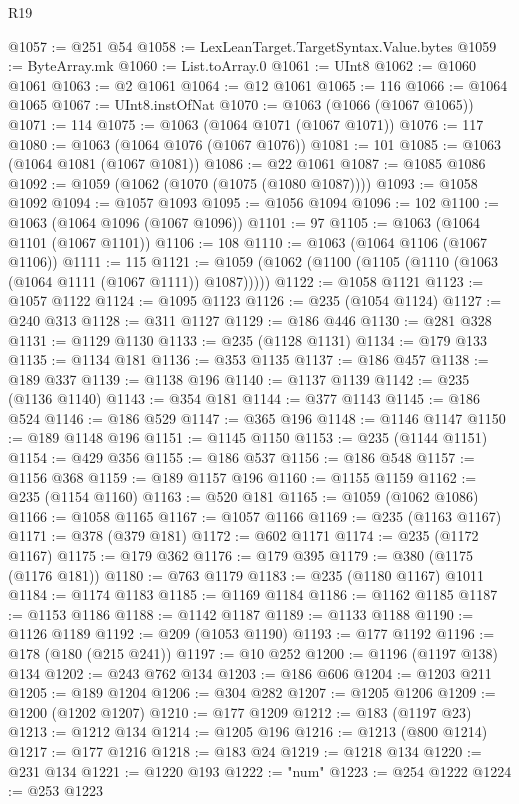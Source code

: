 \begin{lexlean}{R19}
\begin{coremodule}
@1057 := @251 @54
@1058 := LexLeanTarget.TargetSyntax.Value.bytes
@1059 := ByteArray.mk
@1060 := List.toArray.{0}
@1061 := UInt8
@1062 := @1060 @1061
@1063 := @2 @1061
@1064 := @12 @1061
@1065 := 116
@1066 := @1064 @1065
@1067 := UInt8.instOfNat
@1070 := @1063 (@1066 (@1067 @1065))
@1071 := 114
@1075 := @1063 (@1064 @1071 (@1067 @1071))
@1076 := 117
@1080 := @1063 (@1064 @1076 (@1067 @1076))
@1081 := 101
@1085 := @1063 (@1064 @1081 (@1067 @1081))
@1086 := @22 @1061
@1087 := @1085 @1086
@1092 := @1059 (@1062 (@1070 (@1075 (@1080 @1087))))
@1093 := @1058 @1092
@1094 := @1057 @1093
@1095 := @1056 @1094
@1096 := 102
@1100 := @1063 (@1064 @1096 (@1067 @1096))
@1101 := 97
@1105 := @1063 (@1064 @1101 (@1067 @1101))
@1106 := 108
@1110 := @1063 (@1064 @1106 (@1067 @1106))
@1111 := 115
@1121 := @1059 (@1062 (@1100 (@1105 (@1110 (@1063 (@1064 @1111 (@1067 @1111)) @1087)))))
@1122 := @1058 @1121
@1123 := @1057 @1122
@1124 := @1095 @1123
@1126 := @235 (@1054 @1124)
@1127 := @240 @313
@1128 := @311 @1127
@1129 := @186 @446
@1130 := @281 @328
@1131 := @1129 @1130
@1133 := @235 (@1128 @1131)
@1134 := @179 @133
@1135 := @1134 @181
@1136 := @353 @1135
@1137 := @186 @457
@1138 := @189 @337
@1139 := @1138 @196
@1140 := @1137 @1139
@1142 := @235 (@1136 @1140)
@1143 := @354 @181
@1144 := @377 @1143
@1145 := @186 @524
@1146 := @186 @529
@1147 := @365 @196
@1148 := @1146 @1147
@1150 := @189 @1148 @196
@1151 := @1145 @1150
@1153 := @235 (@1144 @1151)
@1154 := @429 @356
@1155 := @186 @537
@1156 := @186 @548
@1157 := @1156 @368
@1159 := @189 @1157 @196
@1160 := @1155 @1159
@1162 := @235 (@1154 @1160)
@1163 := @520 @181
@1165 := @1059 (@1062 @1086)
@1166 := @1058 @1165
@1167 := @1057 @1166
@1169 := @235 (@1163 @1167)
@1171 := @378 (@379 @181)
@1172 := @602 @1171
@1174 := @235 (@1172 @1167)
@1175 := @179 @362
@1176 := @179 @395
@1179 := @380 (@1175 (@1176 @181))
@1180 := @763 @1179
@1183 := @235 (@1180 @1167) @1011
@1184 := @1174 @1183
@1185 := @1169 @1184
@1186 := @1162 @1185
@1187 := @1153 @1186
@1188 := @1142 @1187
@1189 := @1133 @1188
@1190 := @1126 @1189
@1192 := @209 (@1053 @1190)
@1193 := @177 @1192
@1196 := @178 (@180 (@215 @241))
@1197 := @10 @252
@1200 := @1196 (@1197 @138) @134
@1202 := @243 @762 @134
@1203 := @186 @606
@1204 := @1203 @211
@1205 := @189 @1204
@1206 := @304 @282
@1207 := @1205 @1206
@1209 := @1200 (@1202 @1207)
@1210 := @177 @1209
@1212 := @183 (@1197 @23)
@1213 := @1212 @134
@1214 := @1205 @196
@1216 := @1213 (@800 @1214)
@1217 := @177 @1216
@1218 := @183 @24
@1219 := @1218 @134
@1220 := @231 @134
@1221 := @1220 @193
@1222 := "num"
@1223 := @254 @1222
@1224 := @253 @1223

\end{coremodule}
\end{lexlean}
